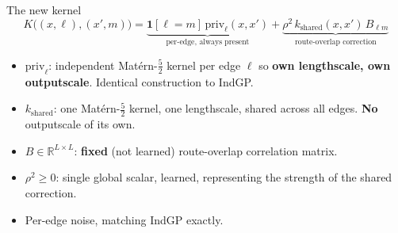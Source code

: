 \documentclass[11pt]{beamer}
\begin{document}
\begin{frame}{The new kernel}
\[
    K\bigl((x,\ell),(x',m)\bigr)
    =
    \underbrace{\mathbf{1}[\ell=m]\,\mathrm{priv}_\ell(x,x')}_{\text{per-edge, always present}}
    +
    \underbrace{\rho^2\, k_{\mathrm{shared}}(x,x')\, B_{\ell m}}_{\text{route-overlap correction}}
\]
\begin{itemize}
    \item $\mathrm{priv}_\ell$: independent Mat\'ern-$\tfrac52$ kernel per
    edge $\ell$ so \textbf{own lengthscale, own outputscale}. Identical
    construction to IndGP.
    \item $k_{\mathrm{shared}}$: one Mat\'ern-$\tfrac52$ kernel, one
    lengthscale, shared across all edges. \textbf{No} outputscale
    of its own.
    \item $B \in \mathbb{R}^{L\times L}$: \textbf{fixed} (not learned)
    route-overlap correlation matrix. 
    \item $\rho^2 \geq 0$: single global scalar, learned, representing the strength of
    the shared correction.
    \item Per-edge noise, matching IndGP exactly.
\end{itemize}
\end{frame}
\end{document}
